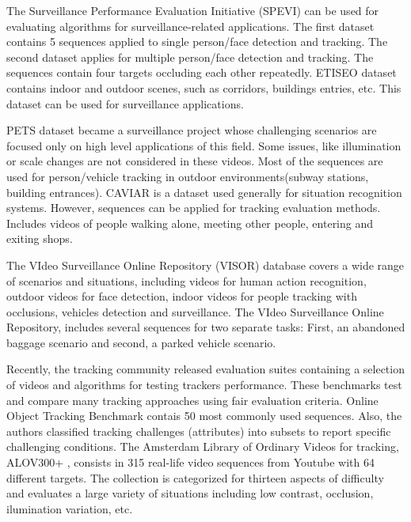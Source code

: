 The Surveillance Performance Evaluation Initiative (SPEVI) \cite{Maggio2005}
can be used for evaluating algorithms for surveillance-related applications. The
first dataset contains 5 sequences applied to single person/face detection and
tracking. The second dataset applies for multiple person/face detection and
tracking. The sequences contain four targets occluding each other repeatedly.
ETISEO dataset \cite{Munder2006} contains indoor and outdoor scenes, such as
corridors, buildings entries, etc. This dataset can be used for surveillance
applications.

PETS dataset \cite{PETS} became a surveillance project whose challenging
scenarios are focused only on high level applications of this field. Some
issues, like illumination or scale changes are not considered in these videos.
Most of the sequences are used for person/vehicle tracking in outdoor
environments(subway stations, building entrances). CAVIAR \cite{Torralba2003}
is a dataset used generally for situation recognition systems. However,
sequences can be applied for tracking evaluation methods. Includes videos of
people walking alone, meeting other people, entering and exiting shops.

The VIdeo Surveillance Online Repository (VISOR) \cite{Vezzani2010} database
covers a wide range of scenarios and situations, including videos for human
action recognition, outdoor videos for face detection, indoor videos for people
tracking with occlusions, vehicles detection and surveillance. The VIdeo
Surveillance Online Repository, includes several sequences for two separate
tasks: First, an abandoned baggage scenario and second, a parked vehicle
scenario.

Recently, the tracking community released evaluation suites containing a
selection of videos and algorithms for testing trackers performance. These
benchmarks test and compare many tracking approaches using fair evaluation
criteria. Online Object Tracking Benchmark \cite{Wu2013b} contais 50 most
commonly used sequences. Also, the authors classified tracking challenges
(attributes) into subsets to report specific challenging conditions. The
Amsterdam Library of Ordinary Videos for tracking, ALOV300+ \cite{Smeulders2014},
consists in 315 real-life video sequences from Youtube with 64 different
targets. The collection is categorized for thirteen aspects of difficulty and
evaluates a large variety of situations including low contrast, occlusion,
ilumination variation, etc.

